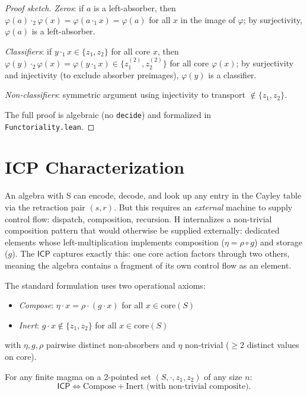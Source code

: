 \documentclass[sigconf,screen,review,anonymous]{acmart}
\newcommand{\dotop}{\cdot}
\newcommand{\ICP}{\textsf{ICP}}
\newcommand{\core}{\mathrm{core}}
\begin{document}
\begin{proof}[Proof sketch]
\emph{Zeros}: if $a$ is a left-absorber, then $\varphi(a) \dotop_2 \varphi(x) = \varphi(a \dotop_1 x) = \varphi(a)$ for all $x$ in the image of $\varphi$; by surjectivity, $\varphi(a)$ is a left-absorber.

\emph{Classifiers}: if $y \dotop_1 x \in \{z_1, z_2\}$ for all core $x$, then $\varphi(y) \dotop_2 \varphi(x) = \varphi(y \dotop_1 x) \in \{z_1^{(2)}, z_2^{(2)}\}$ for all core $\varphi(x)$; by surjectivity and injectivity (to exclude absorber preimages), $\varphi(y)$ is a classifier.

\emph{Non-classifiers}: symmetric argument using injectivity to transport $\notin \{z_1, z_2\}$.

The full proof is algebraic (no \texttt{decide}) and formalized in \texttt{Functoriality.lean}.
\end{proof}

\section{ICP Characterization}
\label{sec:icp}

An algebra with S can encode, decode, and look up any entry in the Cayley table via the retraction pair $(s, r)$. But this requires an \emph{external} machine to supply control flow: dispatch, composition, recursion. H internalizes a non-trivial composition pattern that would otherwise be supplied externally: dedicated elements whose left-multiplication implements composition ($\eta = \rho \circ g$) and storage ($g$). The $\ICP$ captures exactly this: one core action factors through two others, meaning the algebra contains a fragment of its own control flow as an element.

The standard formulation uses two operational axioms:
\begin{itemize}
  \item \emph{Compose}: $\eta \dotop x = \rho \dotop (g \dotop x)$ for all $x \in \core(S)$
  \item \emph{Inert}: $g \dotop x \notin \{z_1, z_2\}$ for all $x \in \core(S)$
\end{itemize}
with $\eta, g, \rho$ pairwise distinct non-absorbers and $\eta$ non-trivial ($\geq 2$ distinct values on core).

\begin{theorem}[$\ICP$ Equivalence]
\label{thm:icp-equiv}
For any finite magma on a 2-pointed set $(S, \dotop, z_1, z_2)$ of any size $n$:
\[
\ICP \iff \text{Compose} + \text{Inert} \text{ (with non-trivial composite)}.
\]
\end{theorem}
\end{document}
